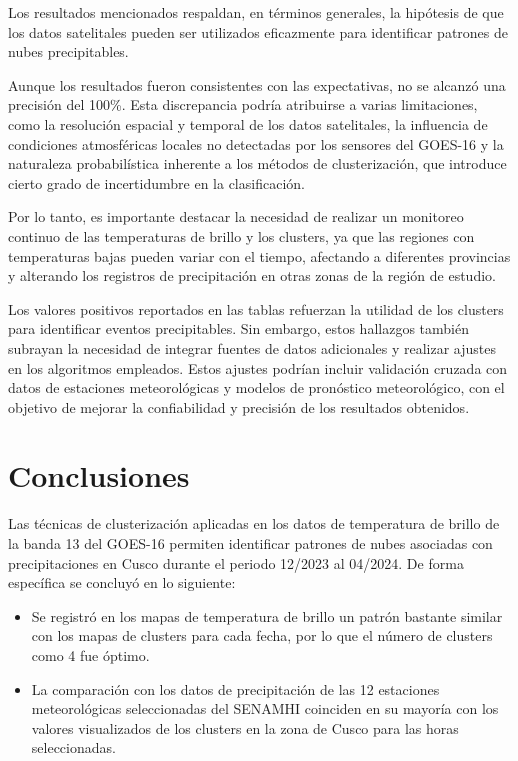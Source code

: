 \documentclass[twocolumn]{IECEjournal} %
\begin{document}
Los resultados mencionados respaldan, en términos generales, la hipótesis de que los datos satelitales pueden ser utilizados eficazmente para identificar patrones de nubes precipitables.

Aunque los resultados fueron consistentes con las expectativas, no se alcanzó una precisión del 100\%. Esta discrepancia podría atribuirse a varias limitaciones, como la resolución espacial y temporal de los datos satelitales, la influencia de condiciones atmosféricas locales no detectadas por los sensores del GOES-16 y la naturaleza probabilística inherente a los métodos de clusterización, que introduce cierto grado de incertidumbre en la clasificación.

Por lo tanto, es importante destacar la necesidad de realizar un monitoreo continuo de las temperaturas de brillo y los clusters, ya que las regiones con temperaturas bajas pueden variar con el tiempo, afectando a diferentes provincias y alterando los registros de precipitación en otras zonas de la región de estudio.

Los valores positivos reportados en las tablas refuerzan la utilidad de los clusters para identificar eventos precipitables. Sin embargo, estos hallazgos también subrayan la necesidad de integrar fuentes de datos adicionales y realizar ajustes en los algoritmos empleados. Estos ajustes podrían incluir validación cruzada con datos de estaciones meteorológicas y modelos de pronóstico meteorológico, con el objetivo de mejorar la confiabilidad y precisión de los resultados obtenidos.

\section{Conclusiones}
Las técnicas de clusterización aplicadas en los datos de temperatura de brillo de la banda 13 del GOES-16 permiten identificar patrones de nubes asociadas con precipitaciones en Cusco durante el periodo 12/2023 al 04/2024. De forma específica se concluyó en lo siguiente:

\begin{itemize}
      \item  Se registró en los mapas de temperatura de brillo un patrón bastante similar con los mapas de clusters para cada fecha, por lo que el número de clusters como 4 fue óptimo.
      \item  La comparación con los datos de precipitación de las 12 estaciones meteorológicas seleccionadas del SENAMHI coinciden en su mayoría con los valores visualizados de los clusters en la zona de Cusco para las horas seleccionadas.
      
\end{itemize}
\end{document}

